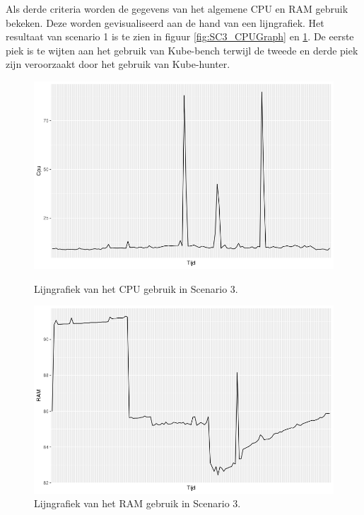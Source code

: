 Als derde criteria worden de gegevens van het algemene CPU en RAM gebruik bekeken. Deze worden gevisualiseerd aan de hand van een lijngrafiek. Het resultaat van scenario 1 is te zien in figuur \ref{fig:SC3_CPUGraph} en \ref{fig:SC3_RAMGraph}. De eerste piek is te wijten aan het gebruik van Kube-bench terwijl de tweede en derde piek zijn veroorzaakt door het gebruik van Kube-hunter.
\begin{figure}[h]
	\centering
	\begin{minipage}[b]{0.45\linewidth}
		\includegraphics[width=\linewidth]{img/SC3_CPUGraph.png}
		\caption{Lijngrafiek van het CPU gebruik in Scenario 3.}
		\label{fig:SC3_CPUGraph}
	\end{minipage}
	\quad
	\begin{minipage}[b]{0.45\linewidth}
		\includegraphics[width=\linewidth]{img/SC3_RAMGraph.png}
		\caption{Lijngrafiek van het RAM gebruik in Scenario 3.}
		\label{fig:SC3_RAMGraph}
	\end{minipage}
\end{figure}


